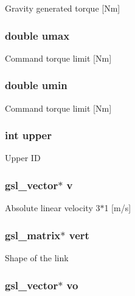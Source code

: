 Gravity generated torque \mbox{[}Nm\mbox{]} \hypertarget{struct_stu_l_i_n_k_aef1161662169119b1f8ed69fa6f66f1c}{
\subsubsection[{umax}]{\setlength{\rightskip}{0pt plus 5cm}double umax}}\label{struct_stu_l_i_n_k_aef1161662169119b1f8ed69fa6f66f1c}
Command torque limit \mbox{[}Nm\mbox{]} \hypertarget{struct_stu_l_i_n_k_aaec2cd9f23b4e9600f892f95b41315fa}{
\subsubsection[{umin}]{\setlength{\rightskip}{0pt plus 5cm}double umin}}\label{struct_stu_l_i_n_k_aaec2cd9f23b4e9600f892f95b41315fa}
Command torque limit \mbox{[}Nm\mbox{]} \hypertarget{struct_stu_l_i_n_k_a0a1a19aadb8cf4f2b05d37a8798b667c}{
\subsubsection[{upper}]{\setlength{\rightskip}{0pt plus 5cm}int upper}}\label{struct_stu_l_i_n_k_a0a1a19aadb8cf4f2b05d37a8798b667c}
Upper I\-D \hypertarget{struct_stu_l_i_n_k_a538022e83bb338f4ce53009e28415044}{
\subsubsection[{v}]{\setlength{\rightskip}{0pt plus 5cm}gsl\-\_\-vector$\ast$ v}}\label{struct_stu_l_i_n_k_a538022e83bb338f4ce53009e28415044}
Absolute linear velocity 3$\ast$1 \mbox{[}m/s\mbox{]} \hypertarget{struct_stu_l_i_n_k_a8d2c6f483124b5b3ca59de9469284fca}{
\subsubsection[{vert}]{\setlength{\rightskip}{0pt plus 5cm}gsl\-\_\-matrix$\ast$ vert}}\label{struct_stu_l_i_n_k_a8d2c6f483124b5b3ca59de9469284fca}
Shape of the link \hypertarget{struct_stu_l_i_n_k_a9af386e4e1dfa53e76c54ddc8e658c62}{
\subsubsection[{vo}]{\setlength{\rightskip}{0pt plus 5cm}gsl\-\_\-vector$\ast$ vo}}\label{struct_stu_l_i_n_k_a9af386e4e1dfa53e76c54ddc8e658c62}
